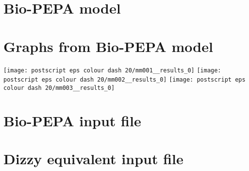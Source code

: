 \documentclass{llncs}
\title{}
\author{}
\institute{}
\begin{document}
\maketitle
\section{Bio-PEPA model}

\section{Graphs from Bio-PEPA model}
\texttt{[image: postscript eps colour dash 20/mm001\_\_results\_0]}
\hfill
\texttt{[image: postscript eps colour dash 20/mm002\_\_results\_0]}
\hfill
\texttt{[image: postscript eps colour dash 20/mm003\_\_results\_0]}
\appendix
\newpage
\section{Bio-PEPA input file}

\newpage
\section{Dizzy equivalent input file}

\end{document}
